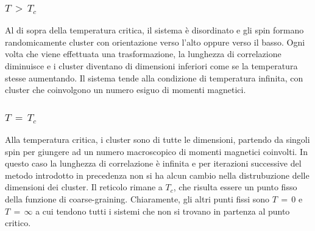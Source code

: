 \subsubsection{$T\,>\,T_c$}

Al di sopra della temperatura critica, il sistema è disordinato e gli spin formano randomicamente cluster con orientazione verso 
l'alto oppure verso il basso. Ogni volta che viene effettuata una trasformazione, la lunghezza di correlazione diminuisce e i cluster 
diventano di dimensioni inferiori come se la temperatura stesse aumentando. Il sistema tende alla condizione di temperatura infinita, 
con cluster che coinvolgono un numero esiguo di momenti magnetici.



\subsubsection{$T\,=\,T_c$}

Alla temperatura critica, i cluster sono di tutte le dimensioni, partendo da singoli spin per giungere ad un numero macroscopico di 
momenti magnetici coinvolti. In questo caso la lunghezza di correlazione è infinita e per iterazioni successive del metodo introdotto 
in precedenza non si ha alcun cambio nella distrubuzione delle dimensioni dei cluster. Il reticolo rimane a $T_c$, che risulta essere 
un punto fisso della funzione di coarse-graining. Chiaramente, gli altri punti fissi sono $T\,=\,0$ e $T\,=\,\infty$ a cui tendono 
tutti i sistemi che non si trovano in partenza al punto critico.
